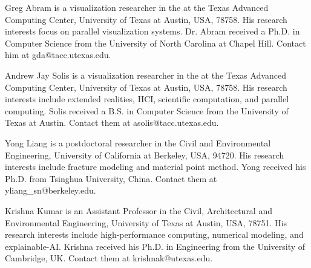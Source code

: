 \documentclass[journal]{IEEEtran}
\begin{document}
\vfill\null
\begin{IEEEbiographynophoto}{Greg Abram}
is a visualization researcher in the at the Texas Advanced Computing Center, University of Texas at Austin, USA, 78758. His research interests focus on parallel visualization systems.   Dr. Abram received a Ph.D. in Computer Science from the University of North Carolina at Chapel Hill. Contact him at gda@tacc.utexas.edu.
\end{IEEEbiographynophoto}
\begin{IEEEbiographynophoto}{Andrew Jay Solis}
is a visualization researcher in the at the Texas Advanced Computing Center, University of Texas at Austin, USA, 78758. His research interests include extended realities, HCI, scientific computation, and parallel computing. Solis received a B.S. in Computer Science from the University of Texas at Austin. Contact them at asolis@tacc.utexas.edu.
\end{IEEEbiographynophoto}
\begin{IEEEbiographynophoto}{Yong Liang}
is a postdoctoral researcher in the Civil and Environmental Engineering, University of California at Berkeley, USA, 94720. His research interests include fracture modeling and material point method. Yong received his Ph.D. from Tsinghua University, China. Contact them at yliang\_sn@berkeley.edu.
\end{IEEEbiographynophoto}
\begin{IEEEbiographynophoto}{Krishna Kumar}
is an Assistant Professor in the Civil, Architectural and Environmental Engineering, University of Texas at Austin, USA, 78751. His research interests include high-performance computing, numerical modeling, and explainable-AI. Krishna received his Ph.D. in Engineering from the University of Cambridge, UK. Contact them at krishnak@utexas.edu.
\end{IEEEbiographynophoto}
\vfill

\end{document}
